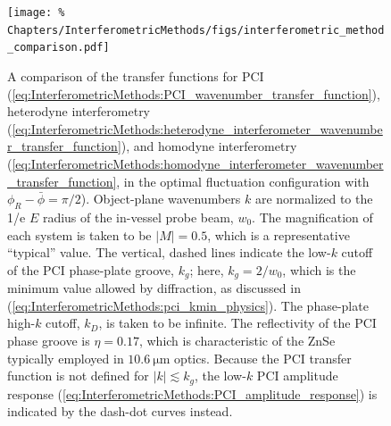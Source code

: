 \begin{figure}
  \centering
  \texttt{[image: \%
    Chapters/InterferometricMethods/figs/interferometric\_method\_comparison.pdf]}
  \caption[Comparison of interferometric-method transfer functions]{%
    A comparison of the transfer functions for
    PCI
    (\ref{eq:InterferometricMethods:PCI_wavenumber_transfer_function}),
    heterodyne interferometry
    (\ref{eq:InterferometricMethods:heterodyne_interferometer_wavenumber_transfer_function}),
    and homodyne interferometry
    (\ref{eq:InterferometricMethods:homodyne_interferometer_wavenumber_transfer_function},
    in the optimal fluctuation configuration
    with $\phi_R - \bar{\phi} = \pi / 2$).
    Object-plane wavenumbers $k$ are normalized
    to the 1/e $E$ radius of the in-vessel probe beam, $w_0$.
    The magnification of each system is taken to be $|M| = 0.5$,
    which is a representative ``typical'' value.
    The vertical, dashed lines indicate
    the low-$k$ cutoff of the PCI phase-plate groove, $k_g$;
    here, $k_g = 2 / w_0$,
    which is the minimum value allowed by diffraction,
    as discussed in
    (\ref{eq:InterferometricMethods:pci_kmin_physics}).
    The phase-plate high-$k$ cutoff, $k_D$,
    is taken to be infinite.
    The reflectivity of the PCI phase groove is $\eta = 0.17$,
    which is characteristic of the ZnSe typically
    employed in $\SI{10.6}{\micro\meter}$ optics.
    Because the PCI transfer function is not defined for $|k| \lesssim k_g$,
    the low-$k$ PCI amplitude response
    (\ref{eq:InterferometricMethods:PCI_amplitude_response})
    is indicated by the dash-dot curves instead.
  }
\label{fig:InterferometricMethods:interferometric_method_transfer_functions}
\end{figure}

